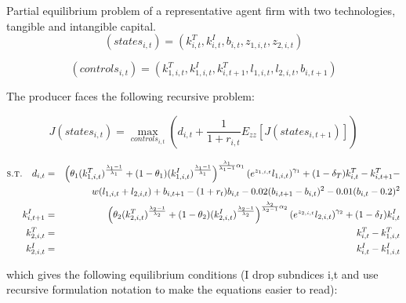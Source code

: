 \documentclass{article}
\begin{document}
Partial equilibrium problem of a representative agent firm with two technologies, tangible and intangible capital.
$$ (states_{i,t}) = (k_{i,t}^T,k_{i,t}^I,b_{i,t},z_{1,i,t},z_{2,i,t})$$

$$ (controls_{i,t}) = (k_{1,i,t}^T, k_{1,i,t}^I, k_{i,t+1}^T, l_{1,i,t},l_{2,i,t}, b_{i,t+1}) $$

The producer faces the following recursive problem:

$$ J(states_{i,t}) = \max_{ controls_{i,t} } \left( d_{i,t} + \frac{1}{1+r_{i,t}}  E_{zz} \left[ J(states_{i,t+1}) \right]  \right) $$

\begin{eqnarray*}
 \textsc{s.t.} \quad d_{i,t} &=& \left( \theta_1 (k_{1,i,t}^T)^{\frac{\lambda_1-1}{\lambda_1}} +(1-\theta_1)(k_{1,i,t}^I)^{\frac{\lambda_1-1}{\lambda_1}} \right)^{\frac{\lambda_1}{\lambda_1-1}\alpha_1} \left( e^{z_{1,i,t}}l_{1,i,t} \right)^{\gamma_1} + (1-\delta_T)k_{i,t}^T - k_{i,t+1}^T -\\
 & & w (l_{1,i,t} + l_{2,i,t}) + b_{i,t+1} - (1+r_t)b_{i,t} - 0.02(b_{i,t+1}-b_{i,t})^2 -0.01(b_{i,t}-0.2)^2 \\
 k_{i,t+1}^I & = & \left( \theta_2 (k_{2,i,t}^T)^{\frac{\lambda_2-1}{\lambda_2}} +(1-\theta_2)(k_{2,i,t}^I)^{\frac{\lambda_2-1}{\lambda_2}} \right)^{\frac{\lambda_2}{\lambda_2-1}\alpha_2}\left( e^{z_{2,i,t}}l_{2,i,t} \right)^{\gamma_2} + (1-\delta_I)k_{i,t}^I \\
 k_{2,i,t}^T  & = & k_{i,t}^T - k_{1,i,t}^T  \\
 k_{2,i,t}^I  & = & k_{i,t}^I - k_{1,i,t}^I  \\
\end{eqnarray*}

which gives the following equilibrium conditions (I drop subndices i,t and use recursive formulation notation to make the equations easier to read):
\end{document}
